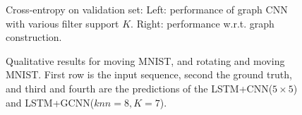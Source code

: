 \documentclass{article} %
\begin{document}
\begin{figure}[t]
	\centering
	\hfill
	\caption{Cross-entropy on validation set: Left: performance of graph CNN with various filter support $K$. Right: performance w.r.t. graph construction.}
	\label{fig:mMNIST_graph}
\end{figure}

\begin{figure}[t]
	\centering
	\hfill
	\caption{Qualitative results for moving MNIST, and rotating and moving MNIST. First row is the input sequence, second the ground truth, and third and fourth are the predictions of the LSTM+CNN($5\times5$) and LSTM+GCNN($knn=8, K=7$).}
	\label{fig:mMNIST_img}
\end{figure}
\end{document}
